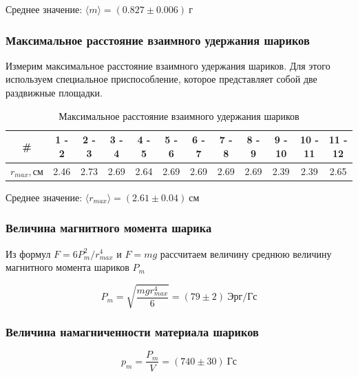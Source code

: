 \documentclass[a4paper, 12pt]{article}
\begin{document}
                Среднее значение: $\langle m \rangle = (0.827 \pm 0.006)~г$

            \subsubsection{Максимальное расстояние взаимного удержания шариков}

                Измерим максимальное расстояние взаимного удержания шариков. Для этого используем специальное приспособление, которое представляет собой две раздвижные площадки.

                \begin{table}[!ht]
                    \centering
                    \begin{tabular}{|c|c|c|c|c|c|c|c|c|c|c|c|}
                        \hline

                        \# & 1 - 2 & 2 - 3 & 3 - 4 & 4 - 5 & 5 - 6 & 6 - 7 & 7 - 8 & 8 - 9 & 9 - 10 & 10 - 11 & 11 - 12\\ \hline
                        $r_{max}, см$ & 2.46 & 2.73 & 2.69 & 2.64 & 2.69 & 2.69 & 2.69 & 2.69 & 2.39 & 2.39 & 2.65\\ \hline

                    \end{tabular}
                    \caption{Максимальное расстояние взаимного удержания шариков}
                    \label{table:r_max}
                \end{table}

                Среднее значение: $\langle r_{max} \rangle = (2.61 \pm 0.04)~см$

            \subsubsection{Величина магнитного момента шарика}

                Из формул $F = 6P_m^2 / r_{max}^4$ и $F = mg$ рассчитаем величину среднюю величину магнитного момента шариков $P_m$

                $$
                    P_m = \sqrt{\frac{m g r_{max}^4}{6}} = (79 \pm 2)~Эрг/Гс
                $$


            \subsubsection{Величина намагниченности материала шариков}

                $$
                    p_m = \frac{P_m}{V} = (740 \pm 30)~Гс
                $$
\end{document}
